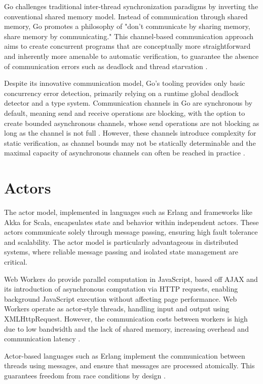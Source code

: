 \documentclass[]{final}
\begin{document}
Go challenges traditional inter-thread synchronization
paradigms by inverting the conventional shared memory model. Instead
of communication through shared memory, Go promotes a philosophy of
"don't communicate by sharing memory, share memory by communicating."
This channel-based communication approach aims to create concurrent programs
that are conceptually more straightforward and inherently more amenable
to automatic verification, to guarantee
the absence of communication errors such as deadlock and
thread starvation \cite{lange_empirical_2019}.

Despite its innovative communication model, Go's tooling provides only basic
concurrency error detection, primarily relying on a runtime global deadlock
detector and a type system. Communication channels
in Go are synchronous by default, meaning send and receive operations are
blocking, with the option to create bounded asynchronous channels, whose
send operations are not blocking as long as the channel
is not full \cite{lange_empirical_2019}. However, these channels
introduce complexity for static verification, as channel bounds may not be
statically determinable and the maximal capacity of
asynchronous channels can often be reached in practice \cite{lange_empirical_2019}.

\section{Actors}
The actor model, implemented in languages such as Erlang and frameworks
like Akka for Scala, encapsulates state and behavior within independent actors.
These actors communicate solely through message passing, ensuring high fault
tolerance and scalability. The actor model is particularly advantageous in
distributed systems, where reliable message passing and isolated state
management are critical.

Web Workers do provide parallel computation in JavaScript, based off AJAX and its
introduction of asynchronous computation via HTTP requests, enabling background
JavaScript execution without affecting page performance. Web Workers operate as
actor-style threads, handling input and output using
XMLHttpRequest. However, the communication costs between workers
is high due to low bandwidth and the lack of shared memory,
increasing overhead and communication latency \cite{namiot_js_2015}.

Actor-based languages such as Erlang
implement the communication between threads
using messages, and ensure that messages are processed
atomically. This guarantees freedom from race conditions
by design \cite{bianchi_survey_2018}.
\end{document}
